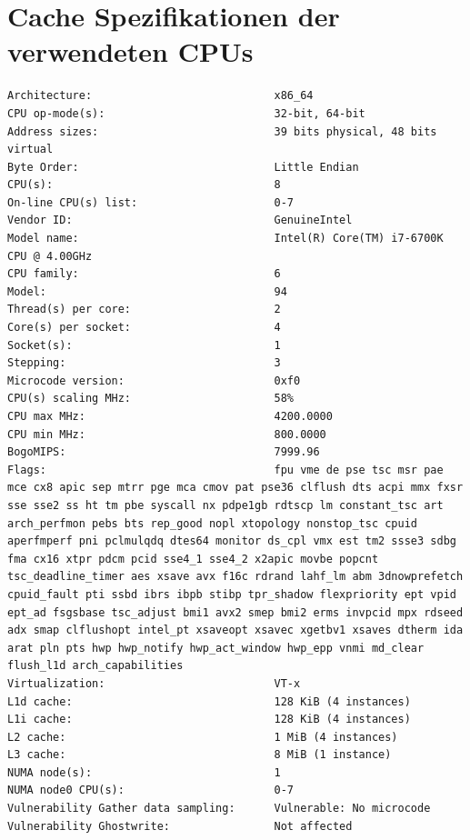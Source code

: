 \section{Cache Spezifikationen der verwendeten \acp{CPU}}
\label{appendix:lscpu-cache}
\begin{lstlisting}[caption={Ausagbe von lscpu und lscpu --caches des
Intel\textregistered\space Core\texttrademark\space i7-6700K}]
Architecture:                            x86_64
CPU op-mode(s):                          32-bit, 64-bit
Address sizes:                           39 bits physical, 48 bits virtual
Byte Order:                              Little Endian
CPU(s):                                  8
On-line CPU(s) list:                     0-7
Vendor ID:                               GenuineIntel
Model name:                              Intel(R) Core(TM) i7-6700K CPU @ 4.00GHz
CPU family:                              6
Model:                                   94
Thread(s) per core:                      2
Core(s) per socket:                      4
Socket(s):                               1
Stepping:                                3
Microcode version:                       0xf0
CPU(s) scaling MHz:                      58%
CPU max MHz:                             4200.0000
CPU min MHz:                             800.0000
BogoMIPS:                                7999.96
Flags:                                   fpu vme de pse tsc msr pae mce cx8 apic sep mtrr pge mca cmov pat pse36 clflush dts acpi mmx fxsr sse sse2 ss ht tm pbe syscall nx pdpe1gb rdtscp lm constant_tsc art arch_perfmon pebs bts rep_good nopl xtopology nonstop_tsc cpuid aperfmperf pni pclmulqdq dtes64 monitor ds_cpl vmx est tm2 ssse3 sdbg fma cx16 xtpr pdcm pcid sse4_1 sse4_2 x2apic movbe popcnt tsc_deadline_timer aes xsave avx f16c rdrand lahf_lm abm 3dnowprefetch cpuid_fault pti ssbd ibrs ibpb stibp tpr_shadow flexpriority ept vpid ept_ad fsgsbase tsc_adjust bmi1 avx2 smep bmi2 erms invpcid mpx rdseed adx smap clflushopt intel_pt xsaveopt xsavec xgetbv1 xsaves dtherm ida arat pln pts hwp hwp_notify hwp_act_window hwp_epp vnmi md_clear flush_l1d arch_capabilities
Virtualization:                          VT-x
L1d cache:                               128 KiB (4 instances)
L1i cache:                               128 KiB (4 instances)
L2 cache:                                1 MiB (4 instances)
L3 cache:                                8 MiB (1 instance)
NUMA node(s):                            1
NUMA node0 CPU(s):                       0-7
Vulnerability Gather data sampling:      Vulnerable: No microcode
Vulnerability Ghostwrite:                Not affected

\end{lstlisting}
